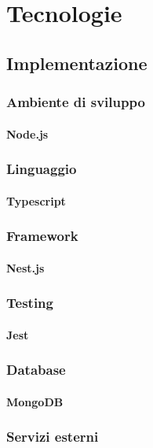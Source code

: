 \chapter{Tecnologie}


\section{Implementazione}
\subsection{Ambiente di sviluppo}
\subsubsection{Node.js}

\subsection{Linguaggio}
\subsubsection{Typescript}

\subsection{Framework}
\subsubsection{Nest.js}

\subsection{Testing}
\subsubsection{Jest}

\subsection{Database}
\subsubsection{MongoDB}

\subsection{Servizi esterni}
